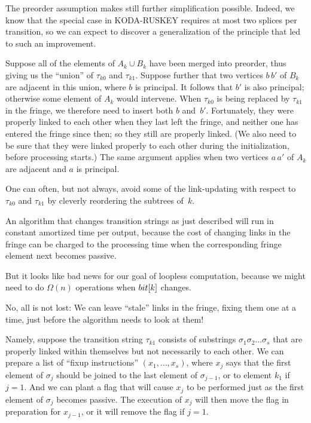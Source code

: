 \fi

The preorder assumption makes still further
simplification possible.
Indeed, we know that the special case in {\mc KODA-RUSKEY} requires
at most two splices per transition, so we can expect to discover
a generalization of the principle that led to such an improvement.

Suppose all of the elements of $A_k\cup B_k$ have been merged into
preorder, thus giving us the ``union'' of $\tau_{k0}$ and $\tau_{k1}$.
Suppose further that two vertices $b\,b'$ of $B_k$ are adjacent in
this union, where $b$ is principal. It follows that $b'$ is also
principal; otherwise some element of $A_k$ would intervene.
When $\tau_{k0}$ is being replaced by $\tau_{k1}$ in the fringe,
we therefore need to insert both $b$ and~$b'$. Fortunately, they were
properly linked to each other when they last left the fringe,
and neither one has entered the fringe since then; so they still are
properly linked. (We also need to be sure that they were linked properly
to each other during the initialization, before processing starts.)
The same argument applies when two vertices $a\,a'$ of $A_k$ are
adjacent and $a$ is principal.

One can often, but not always,
avoid some of the link-updating with respect to $\tau_{k0}$ and
$\tau_{k1}$ by cleverly reordering the subtrees of~$k$.

\fi

An algorithm that changes transition strings as just
described will run
in constant amortized time per output, because the cost of changing
links in the fringe can be charged to the processing time when the
corresponding fringe element next becomes passive.

But it looks like bad news for our goal of loopless computation,
because we might need to do $\Omega(n)$ operations when $\\{bit}[k]$ changes.

No, all is not lost: We can leave ``stale'' links in the fringe,
fixing them one at a time, just before the algorithm needs to look at them!

Namely, suppose the transition string $\tau_{k1}$ consists of substrings
$\sigma_1\sigma_2\ldots\sigma_s$ that are properly linked within themselves
but not necessarily to each other. We can prepare a list of ``fixup
instructions'' $(x_1,\ldots,x_s)$, where $x_j$ says that the first element
of $\sigma_j$ should be joined to the last element of $\sigma_{j-1}$, or
to element $k_1$ if $j=1$. And we can plant a flag that will cause $x_j$ to
be performed just as the first element of $\sigma_j$ becomes passive.
The execution of $x_j$ will then move the flag in preparation for $x_{j-1}$,
or it will remove the flag if $j=1$.

